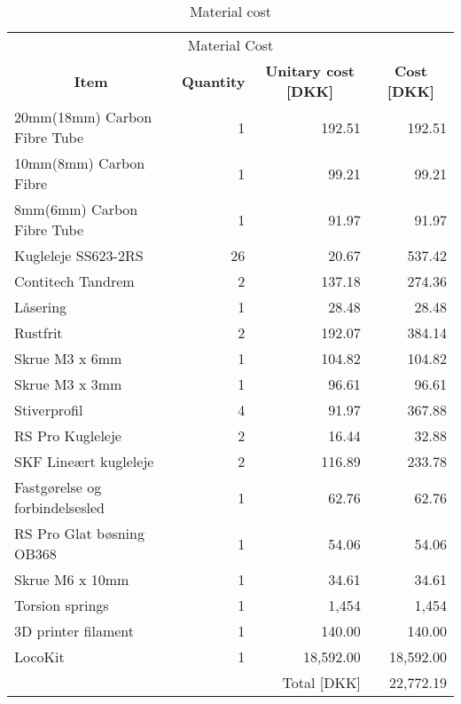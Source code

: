 \begin{table}[htbp]
\caption{Material cost}
\begin{tabular}{l|r|r|r}

\multicolumn{4}{c}{\Large Material Cost} \\
\multicolumn{1}{c|}{\textbf{Item}} & \multicolumn{1}{c|}{\textbf{Quantity}} & \multicolumn{1}{c|}{\textbf{Unitary cost [DKK]}} & \multicolumn{1}{c}{\textbf{Cost [DKK]}} \\ \hline
20mm(18mm) Carbon Fibre Tube & 1 & 192.51 & 192.51 \\ \hline
10mm(8mm) Carbon Fibre & 1 & 99.21 & 99.21 \\ \hline
8mm(6mm) Carbon Fibre Tube & 1 & 91.97 & 91.97 \\ \hline
Kugleleje SS623-2RS & 26 & 20.67 & 537.42 \\ \hline
Contitech Tandrem & 2 & 137.18 & 274.36 \\ \hline
Låsering & 1 & 28.48 & 28.48 \\ \hline
Rustfrit & 2 & 192.07 & 384.14 \\ \hline
Skrue M3 x 6mm & 1 & 104.82 & 104.82 \\ \hline
Skrue M3 x 3mm & 1 & 96.61 & 96.61 \\ \hline
Stiverprofil & 4 & 91.97 & 367.88 \\ \hline
RS Pro Kugleleje & 2 & 16.44 & 32.88 \\ \hline
SKF Lineært kugleleje & 2 & 116.89 & 233.78 \\ \hline
Fastgørelse og forbindelsesled & 1 & 62.76 & 62.76 \\ \hline
RS Pro Glat bøsning OB368 & 1 & 54.06 & 54.06 \\ \hline
Skrue M6 x 10mm & 1 & 34.61 & 34.61 \\ \hline
Torsion springs & 1 & 1,454 & 1,454 \\ \hline
3D printer filament & 1 & 140.00 & 140.00 \\ \hline
LocoKit  & 1 & 18,592.00 & 18,592.00 \\ \hline
\multicolumn{2}{l}{} & Total [DKK] & 22,772.19 \\
\end{tabular}
\label{tab:material_cost}
\end{table}

